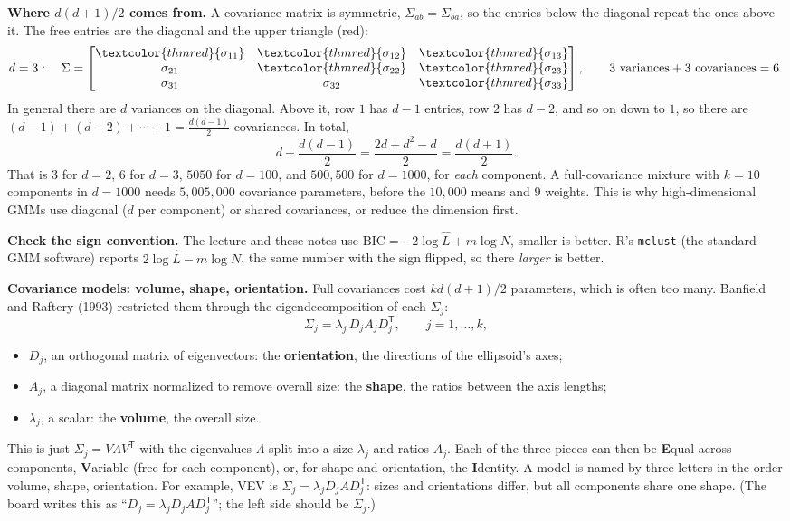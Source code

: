 \documentclass[11pt]{article}
\newcommand{\T}{^{\mathsf T}}
\begin{document}
\begin{intuition}
\textbf{Where $d(d+1)/2$ comes from.} A covariance matrix is symmetric, $\Sigma_{ab}=\Sigma_{ba}$, so the entries below the diagonal repeat the ones above it. The free entries are the diagonal and the upper triangle (red):
\[
d=3:\quad
\Sigma=\begin{bmatrix}
\textcolor{thmred}{\sigma_{11}}&\textcolor{thmred}{\sigma_{12}}&\textcolor{thmred}{\sigma_{13}}\\
\sigma_{21}&\textcolor{thmred}{\sigma_{22}}&\textcolor{thmred}{\sigma_{23}}\\
\sigma_{31}&\sigma_{32}&\textcolor{thmred}{\sigma_{33}}
\end{bmatrix},
\qquad 3\text{ variances}+3\text{ covariances}=6 .
\]
In general there are $d$ variances on the diagonal. Above it, row $1$ has $d-1$ entries, row $2$ has $d-2$, and so on down to $1$, so there are $(d-1)+(d-2)+\cdots+1=\frac{d(d-1)}2$ covariances. In total,
\[
d+\frac{d(d-1)}2=\frac{2d+d^2-d}2=\frac{d(d+1)}2 .
\]
That is $3$ for $d=2$, $6$ for $d=3$, $5050$ for $d=100$, and $500{,}500$ for $d=1000$, for \emph{each} component. A full-covariance mixture with $k=10$ components in $d=1000$ needs $5{,}005{,}000$ covariance parameters, before the $10{,}000$ means and $9$ weights. This is why high-dimensional GMMs use diagonal ($d$ per component) or shared covariances, or reduce the dimension first.
\end{intuition}

\begin{careful}
\textbf{Check the sign convention.} The lecture and these notes use $\mathrm{BIC}=-2\log\widehat L+m\log N$, smaller is better. R's \texttt{mclust} (the standard GMM software) reports $2\log\widehat L-m\log N$, the same number with the sign flipped, so there \emph{larger} is better.
\end{careful}

\textbf{Covariance models: volume, shape, orientation.} Full covariances cost $kd(d+1)/2$ parameters, which is often too many. Banfield and Raftery (1993) restricted them through the eigendecomposition of each $\Sigma_j$:
\[
\Sigma_j=\lambda_j\,D_jA_jD_j\T,\qquad j=1,\dots,k,
\]
\begin{itemize}[nosep]
\item $D_j$, an orthogonal matrix of eigenvectors: the \textbf{orientation}, the directions of the ellipsoid's axes;
\item $A_j$, a diagonal matrix normalized to remove overall size: the \textbf{shape}, the ratios between the axis lengths;
\item $\lambda_j$, a scalar: the \textbf{volume}, the overall size.
\end{itemize}
This is just $\Sigma_j=V\Lambda V\T$ with the eigenvalues $\Lambda$ split into a size $\lambda_j$ and ratios $A_j$. Each of the three pieces can then be \textbf{E}qual across components, \textbf{V}ariable (free for each component), or, for shape and orientation, the \textbf{I}dentity. A model is named by three letters in the order volume, shape, orientation. For example, VEV is $\Sigma_j=\lambda_jD_jAD_j\T$: sizes and orientations differ, but all components share one shape. (The board writes this as ``$D_j=\lambda_jD_jAD_j\T$''; the left side should be $\Sigma_j$.)
\end{document}
